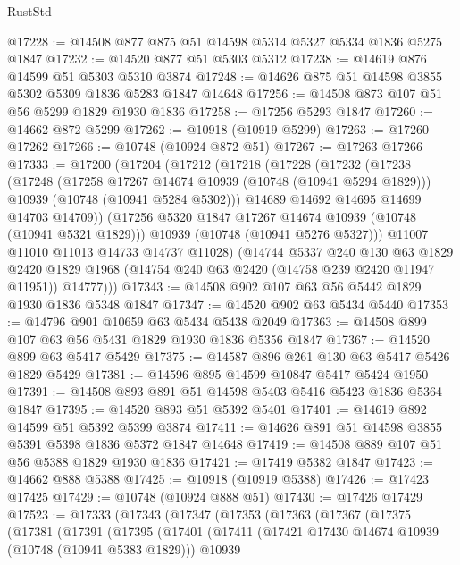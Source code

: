 \begin{lexlean}{RustStd}
\begin{coremodule}
{\begin{coremodule}
{{{{{@17228 := @14508 @877 @875 @51 @14598 @5314 @5327 @5334 @1836 @5275 @1847
@17232 := @14520 @877 @51 @5303 @5312
@17238 := @14619 @876 @14599 @51 @5303 @5310 @3874
@17248 := @14626 @875 @51 @14598 @3855 @5302 @5309 @1836 @5283 @1847 @14648
@17256 := @14508 @873 @107 @51 @56 @5299 @1829 @1930 @1836
@17258 := @17256 @5293 @1847
@17260 := @14662 @872 @5299
@17262 := @10918 (@10919 @5299)
@17263 := @17260 @17262
@17266 := @10748 (@10924 @872 @51)
@17267 := @17263 @17266
@17333 := @17200
    (@17204
      (@17212
        (@17218
          (@17228
            (@17232
              (@17238
                (@17248
                  (@17258 @17267 @14674 @10939 (@10748 (@10941 @5294 @1829)))
                  @10939
                  (@10748 (@10941 @5284 @5302)))
                @14689
                @14692
                @14695
                @14699
                @14703
                @14709))
            (@17256 @5320 @1847 @17267 @14674 @10939 (@10748 (@10941 @5321 @1829)))
            @10939
            (@10748 (@10941 @5276 @5327)))
          @11007
          @11010
          @11013
          @14733
          @14737
          @11028)
        (@14744
          @5337
          @240
          @130
          @63
          @1829
          @2420
          @1829
          @1968
          (@14754 @240 @63 @2420 (@14758 @239 @2420 @11947 @11951))
          @14777)))
@17343 := @14508 @902 @107 @63 @56 @5442 @1829 @1930 @1836 @5348 @1847
@17347 := @14520 @902 @63 @5434 @5440
@17353 := @14796 @901 @10659 @63 @5434 @5438 @2049
@17363 := @14508 @899 @107 @63 @56 @5431 @1829 @1930 @1836 @5356 @1847
@17367 := @14520 @899 @63 @5417 @5429
@17375 := @14587 @896 @261 @130 @63 @5417 @5426 @1829 @5429
@17381 := @14596 @895 @14599 @10847 @5417 @5424 @1950
@17391 := @14508 @893 @891 @51 @14598 @5403 @5416 @5423 @1836 @5364 @1847
@17395 := @14520 @893 @51 @5392 @5401
@17401 := @14619 @892 @14599 @51 @5392 @5399 @3874
@17411 := @14626 @891 @51 @14598 @3855 @5391 @5398 @1836 @5372 @1847 @14648
@17419 := @14508 @889 @107 @51 @56 @5388 @1829 @1930 @1836
@17421 := @17419 @5382 @1847
@17423 := @14662 @888 @5388
@17425 := @10918 (@10919 @5388)
@17426 := @17423 @17425
@17429 := @10748 (@10924 @888 @51)
@17430 := @17426 @17429
@17523 := @17333
    (@17343
      (@17347
        (@17353
          (@17363
            (@17367
              (@17375
                (@17381
                  (@17391
                    (@17395
                      (@17401
                        (@17411
                          (@17421 @17430 @14674 @10939 (@10748 (@10941 @5383 @1829)))
                          @10939
}}}}}
\end{coremodule}}
\end{coremodule}
\end{lexlean}
